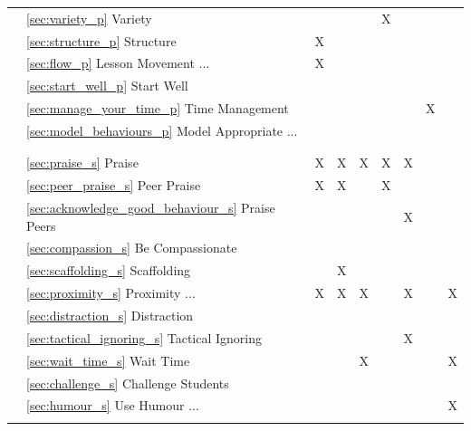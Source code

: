 \documentclass[12pt]{report}
\begin{document}
\begin{longtable}{rl|c|c|c|c|c|c|c|}
& \hspace{6pt}\ref{sec:variety_p} Variety                        & & & &X& & & \\
& \hspace{6pt}\ref{sec:structure_p} Structure                      &X& & & & & & \\
& \ref{sec:flow_p} Lesson Movement ...                                       &X& & & & & & \\
& \hspace{6pt}\ref{sec:start_well_p} Start Well                     & & & & & & & \\
& \ref{sec:manage_your_time_p} Time Management                           & & & & & &X& \\
& \ref{sec:model_behaviours_p} Model Appropriate ...                          & & & & & & & \\
\hline
 & & & & & & & & \\
 & & & & & & & & \\ \hline
\parbox[t]{2mm}{}
& \ref{sec:praise_s} Praise                                     &X&X&X&X&X& & \\
& \hspace{6pt}\ref{sec:peer_praise_s} Peer Praise                    &X&X& &X& & & \\
& \hspace{6pt}\ref{sec:acknowledge_good_behaviour_s} Praise Peers     & & & & &X& & \\
& \ref{sec:compassion_s} Be Compassionate                                 & & & & & & & \\
& \ref{sec:scaffolding_s} Scaffolding                                & &X& & & & & \\
& \ref{sec:proximity_s} Proximity ...                                  &X&X&X& &X& &X\\
& \ref{sec:distraction_s} Distraction                                & & & & & & & \\
& \ref{sec:tactical_ignoring_s} Tactical Ignoring                          & & & & &X& & \\
& \ref{sec:wait_time_s} Wait Time                                  & & &X& & & &X\\
& \ref{sec:challenge_s} Challenge Students                                  & & & & & & & \\
& \ref{sec:humour_s} Use Humour ...                                  & & & & & & &X\\
\hline
 & & & & & & & & \\ 

\end{longtable}
\end{document}
